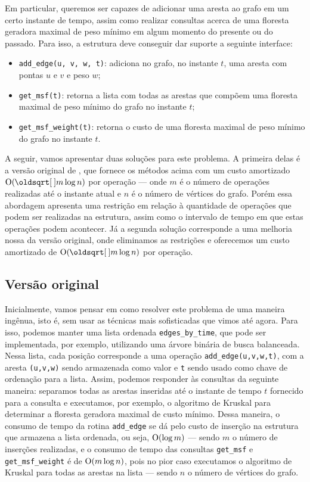 Em particular, queremos ser capazes de adicionar uma aresta ao grafo em um certo instante de tempo, assim como realizar consultas acerca de uma floresta geradora maximal de peso mínimo em algum momento do presente ou do passado. Para isso, a estrutura deve conseguir dar suporte a seguinte interface:

\begin{itemize}
    \item \texttt{add\_edge(u, v, w, t)}: adiciona no grafo, no instante $t$, uma aresta com pontas $u$ e $v$ e peso $w$;
    \item \texttt{get\_msf(t)}: retorna a lista com todas as arestas que compõem uma floresta maximal de peso mínimo do grafo no instante $t$;
    \item \texttt{get\_msf\_weight(t)}: retorna o custo de uma floresta maximal de peso mínimo do grafo no instante $t$.
\end{itemize}

A seguir, vamos apresentar duas soluções para este problema. A primeira delas é a versão original de \citet{10.1093/comjnl/bxaa135}, que fornece os métodos acima com um custo amortizado $\Oh(\sqrt{m} \log n)$ por operação --- onde $m$ é o número de operações realizadas até o instante atual e $n$ é o número de vértices do grafo. Porém essa abordagem apresenta uma restrição em relação à quantidade de operações que podem ser realizadas na estrutura, assim como o intervalo de tempo em que estas operações podem acontecer. Já a segunda solução corresponde a uma melhoria nossa da versão original, onde eliminamos as restrições e oferecemos um custo amortizado de $\Oh(\sqrt{m} \log n)$ por operação.

\subsection{Versão original}
\label{sec:rmsf-versao-ori}

Inicialmente, vamos pensar em como resolver este problema de uma maneira ingênua, isto é, sem usar as técnicas mais sofisticadas que vimos até agora. Para isso, podemos manter uma lista ordenada \texttt{edges\_by\_time}, que pode ser implementada, por exemplo, utilizando uma árvore binária de busca balanceada. Nessa lista, cada posição corresponde a uma operação \texttt{add\_edge(u,v,w,t)}, com a aresta \texttt{(u,v,w)} sendo armazenada como valor e \texttt{t} sendo usado como chave de ordenação para a lista. Assim, podemos responder às consultas da seguinte maneira: separamos todas as arestas inseridas até o instante de tempo $t$ fornecido para a consulta e executamos, por exemplo, o algoritmo de Kruskal para determinar a floresta geradora maximal de custo mínimo. Dessa maneira, o consumo de tempo da rotina \texttt{add\_edge} se dá pelo custo de inserção na estrutura que armazena a lista ordenada, ou seja, $\mathrm{O} (\log m)$ --- sendo $m$ o número de inserções realizadas, e o consumo de tempo das consultas \texttt{get\_msf} e \texttt{get\_msf\_weight} é de $\mathrm{O}(m \log n)$, pois no pior caso executamos o algoritmo de Kruskal para todas as arestas na lista --- sendo $n$ o número de vértices do grafo.

